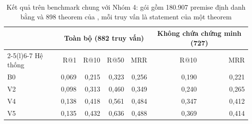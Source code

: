 \begin{table}[htbp]
\centering
\caption[Kết quả trên benchmark chung với Nhóm 4]{Kết quả trên benchmark chung với Nhóm 4: gói  gồm 180.907 premise định danh bằng  và 898 theorem của , mỗi truy vấn là statement của một theorem}\label{tab:shared}
\begin{tabular}{@{}lrrrrrr@{}}
\toprule
& \multicolumn{4}{c}{Toàn bộ (882 truy vấn)} & \multicolumn{2}{c}{Không chứa chứng minh (727)} \\
\cmidrule(lr){2-5}\cmidrule(l){6-7}
Hệ thống & R@1 & R@10 & R@50 & MRR & R@10 & MRR \\
\midrule
B0 & 0,069 & 0,215 & 0,323 & 0,256 & 0,190 & 0,221 \\
V2 & 0,098 & 0,313 & 0,460 & 0,349 & 0,240 & 0,265 \\
V4 & 0,138 & 0,418 & 0,561 & 0,484 & 0,347 & 0,412 \\
V5 & 0,135 & 0,432 & 0,636 & 0,488 & 0,369 & 0,414 \\
\bottomrule
\end{tabular}
\par{}
\end{table}
